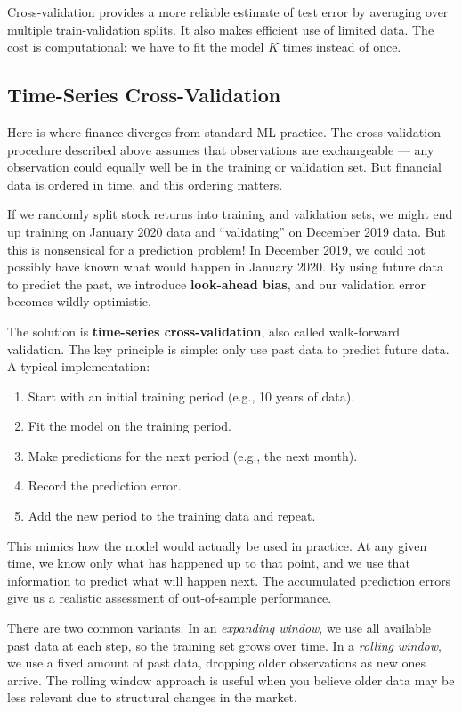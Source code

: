 \documentclass[11pt,a4paper]{article}
\newcommand{\keyword}[1]{\textbf{\textcolor{AccentOrange}{#1}}}
\begin{document}
Cross-validation provides a more reliable estimate of test error by averaging over multiple train-validation splits. It also makes efficient use of limited data. The cost is computational: we have to fit the model $K$ times instead of once.

\subsection{Time-Series Cross-Validation}

Here is where finance diverges from standard ML practice. The cross-validation procedure described above assumes that observations are exchangeable — any observation could equally well be in the training or validation set. But financial data is ordered in time, and this ordering matters.

If we randomly split stock returns into training and validation sets, we might end up training on January 2020 data and ``validating'' on December 2019 data. But this is nonsensical for a prediction problem! In December 2019, we could not possibly have known what would happen in January 2020. By using future data to predict the past, we introduce \keyword{look-ahead bias}, and our validation error becomes wildly optimistic.

The solution is \keyword{time-series cross-validation}, also called walk-forward validation. The key principle is simple: only use past data to predict future data. A typical implementation:

\begin{enumerate}
    \item Start with an initial training period (e.g., 10 years of data).
    \item Fit the model on the training period.
    \item Make predictions for the next period (e.g., the next month).
    \item Record the prediction error.
    \item Add the new period to the training data and repeat.
\end{enumerate}

This mimics how the model would actually be used in practice. At any given time, we know only what has happened up to that point, and we use that information to predict what will happen next. The accumulated prediction errors give us a realistic assessment of out-of-sample performance.

There are two common variants. In an \emph{expanding window}, we use all available past data at each step, so the training set grows over time. In a \emph{rolling window}, we use a fixed amount of past data, dropping older observations as new ones arrive. The rolling window approach is useful when you believe older data may be less relevant due to structural changes in the market.
\end{document}
